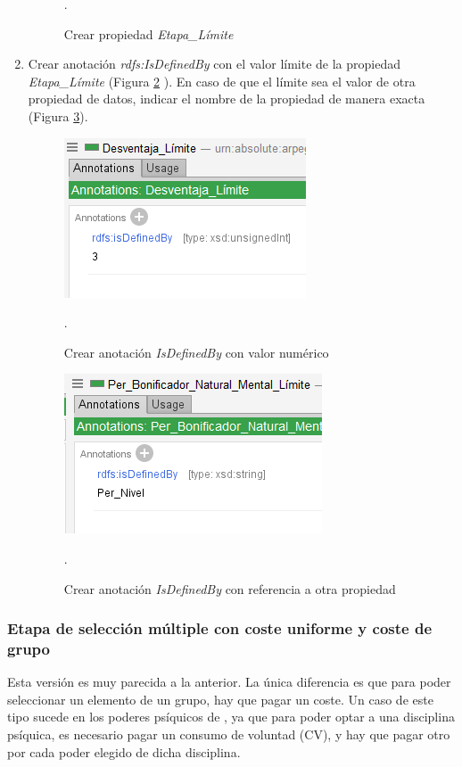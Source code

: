 \begin{enumerate}
\begin{figure}[H]
        \caption{Crear propiedad \textit{Etapa\_Límite}}.
        \label{MultipleChoice_2}
    \end{figure}
    \item Crear anotación \textit{rdfs:IsDefinedBy} con el valor límite de la propiedad \textit{Etapa\_Límite} 
    (Figura \ref*{MultipleChoice_3} ). En caso de que el límite sea el valor de otra propiedad de datos, indicar 
    el nombre de la propiedad de manera exacta (Figura \ref*{MultipleChoice_4}).
    \begin{figure}[H]
        \centering
        \includegraphics[scale=0.6]{Figures/Protege/MultipleChoice_3.png}
        \caption{Crear anotación \textit{IsDefinedBy} con valor numérico}.
        \label{MultipleChoice_3}
    \end{figure}
    \begin{figure}[H]
        \centering
        \includegraphics[scale=0.6]{Figures/Protege/MultipleChoice_4.png}
        \caption{Crear anotación \textit{IsDefinedBy} con referencia a otra propiedad}.
        \label{MultipleChoice_4}
    \end{figure}
\end{enumerate}

\subsubsection{Etapa de selección múltiple con coste uniforme y coste de grupo}
Esta versión es muy parecida a la anterior. La única diferencia es que para poder seleccionar un elemento de un grupo, hay que pagar 
un coste. Un caso de este tipo sucede en los poderes psíquicos de \anima, ya que para poder optar a una disciplina psíquica, es 
necesario pagar un consumo de voluntad (CV), y hay que pagar otro por cada poder elegido de dicha disciplina.

